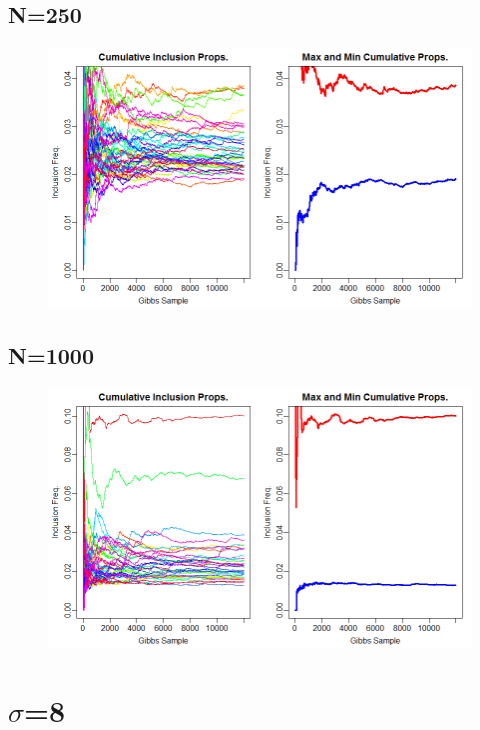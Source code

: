 \documentclass[12pt]{article}
\begin{document}
\subsection*{N=250}
\begin{figure}[H]
\centerline{\includegraphics[scale=.52]{sq2_n250}}
\end{figure}

\subsection*{N=1000}
\begin{figure}[H]
\centerline{\includegraphics[scale=.52]{sq2_n1000}}

\end{figure}


\section{$\sigma$=8}
\end{document}
